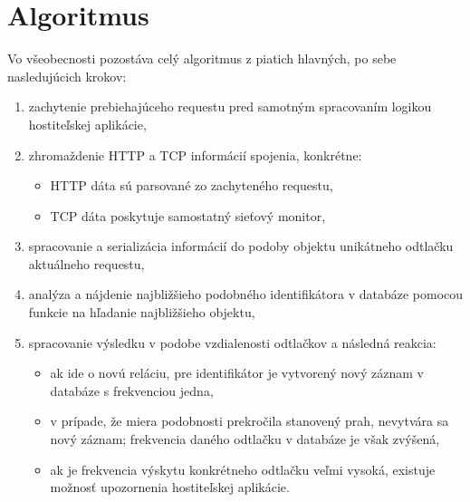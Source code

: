\documentclass[
  digital, %
  table,   %
  lof,     %
  nolot,   %
  nocover
]{fithesis3}
\begin{document}
\section{Algoritmus}
Vo všeobecnosti pozostáva celý algoritmus z piatich hlavných, po sebe nasledujúcich krokov:
\begin{enumerate}
  \item zachytenie prebiehajúceho requestu pred samotným spracovaním logikou hostiteľskej aplikácie,
  \item zhromaždenie HTTP a TCP informácií spojenia, konkrétne:
  \begin{itemize}
    \item HTTP dáta sú parsované zo zachyteného requestu,
    \item TCP dáta poskytuje samostatný sieťový monitor,
  \end{itemize}
  \item spracovanie a serializácia informácií do podoby objektu unikátneho odtlačku
  aktuálneho requestu,
  \item analýza a nájdenie najbližšieho podobného identifikátora v databáze pomocou funkcie na
  hľadanie najbližšieho objektu,
  \item spracovanie výsledku v podobe vzdialenosti odtlačkov a následná reakcia:
  \begin{itemize}
    \item ak ide o novú reláciu, pre identifikátor je vytvorený nový záznam v databáze s frekvenciou jedna,
    \item v prípade, že miera podobnosti prekročila stanovený prah, nevytvára
    sa nový záznam; frekvencia daného odtlačku v databáze je však zvýšená,
    \item ak je frekvencia výskytu konkrétneho odtlačku veľmi vysoká, existuje
    možnosť upozornenia hostiteľskej aplikácie.
  \end{itemize}
\end{enumerate}
\end{document}
